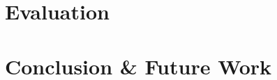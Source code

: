 \documentclass{sigchi}
\begin{document}
\section{Evaluation}



\section{Conclusion \& Future Work}


\balance




\end{document}
